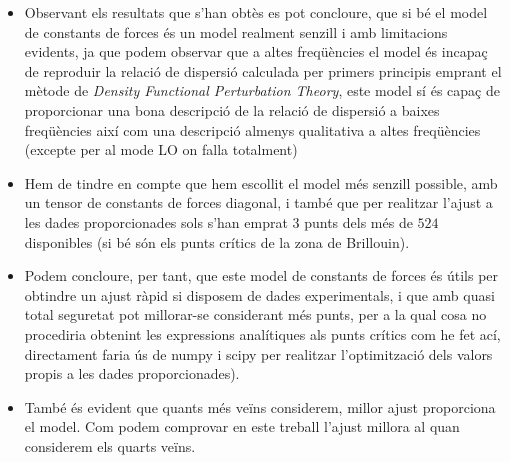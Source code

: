 \documentclass[12pt]{article} %
\begin{document}
\begin{itemize}

\item Observant els resultats que s'han obtès es pot concloure, que si bé el model de constants de forces és un model realment senzill i amb limitacions evidents, ja que podem observar que a altes freqüències el model és incapaç de reproduir la relació de dispersió calculada per primers principis emprant el mètode de \emph {Density Functional Perturbation Theory}, este model sí és capaç de proporcionar una bona descripció de la relació de dispersió a baixes freqüències així com una descripció almenys qualitativa a altes freqüències (excepte per al mode LO on falla totalment) 



\item Hem de tindre en compte que hem escollit el model més senzill possible, amb un tensor de constants de forces diagonal, i també que per realitzar l'ajust a les dades proporcionades sols s'han emprat $3$ punts dels més de $524$ disponibles (si bé són els punts crítics de la zona de Brillouin).
\item Podem concloure, per tant, que este model de constants de forces és útils per obtindre un ajust ràpid si disposem de dades experimentals, i que amb quasi total seguretat pot millorar-se considerant més punts, per a la qual cosa no procediria obtenint les expressions analítiques als punts crítics com he fet ací, directament faria ús de numpy i scipy per realitzar l'optimització dels valors propis a les dades proporcionades).
\item També és evident que quants més veïns considerem, millor ajust proporciona el model. Com podem comprovar en este treball l'ajust millora al quan considerem els quarts veïns.
\end{itemize}

\vspace{\baselineskip}
\end{document}
